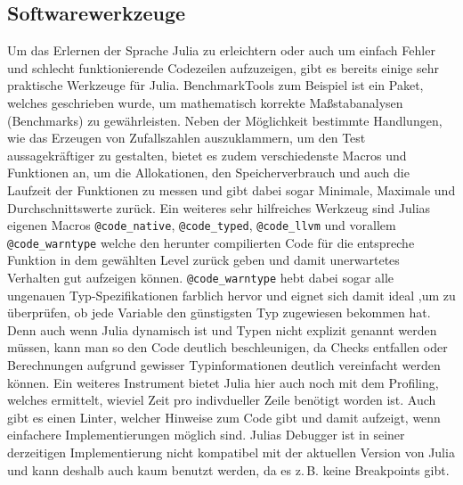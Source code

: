 \documentclass[proseminar,german,utf8]{zihpub}
\newcommand{\zB}[0]{{z.\,B. }}
\begin{document}
\subsection{Softwarewerkzeuge}

Um das Erlernen der Sprache Julia zu erleichtern oder auch um einfach Fehler und schlecht funktionierende Codezeilen aufzuzeigen, gibt es bereits einige sehr praktische Werkzeuge für Julia. BenchmarkTools zum Beispiel ist ein Paket, welches geschrieben wurde, um mathematisch korrekte Maßstabanalysen (Benchmarks) zu gewährleisten. Neben der Möglichkeit bestimmte Handlungen, wie das Erzeugen von Zufallszahlen auszuklammern, um den Test aussagekräftiger zu gestalten, bietet es zudem verschiedenste Macros und Funktionen an, um die Allokationen, den Speicherverbrauch und auch die Laufzeit der Funktionen zu messen und gibt dabei sogar Minimale, Maximale und Durchschnittswerte zurück. Ein weiteres sehr hilfreiches Werkzeug sind Julias eigenen Macros \verb|@code_native|, \verb|@code_typed|, \verb|@code_llvm| und vorallem \verb|@code_warntype| welche den herunter compilierten Code für die entspreche Funktion in dem gewählten Level zurück geben und damit unerwartetes Verhalten gut aufzeigen können. \verb|@code_warntype| hebt dabei sogar alle ungenauen Typ-Spezifikationen farblich hervor und eignet sich damit ideal ,um zu überprüfen, ob jede Variable den günstigsten Typ zugewiesen bekommen hat. Denn auch wenn Julia dynamisch ist und Typen nicht explizit genannt werden müssen, kann man so den Code deutlich beschleunigen, da Checks entfallen oder Berechnungen aufgrund gewisser Typinformationen deutlich vereinfacht werden können. Ein weiteres Instrument bietet Julia hier auch noch mit dem Profiling, welches ermittelt, wieviel Zeit pro indivdueller Zeile benötigt worden ist. Auch gibt es einen Linter, welcher Hinweise zum Code gibt und damit aufzeigt, wenn einfachere Implementierungen möglich sind. Julias Debugger ist in seiner derzeitigen Implementierung nicht kompatibel mit der aktuellen Version von Julia und kann deshalb auch kaum benutzt werden, da es \zB keine Breakpoints gibt.~\cite{JuliaLangDocumentation}
\end{document}
